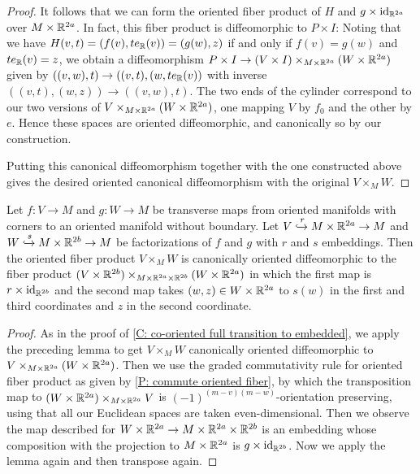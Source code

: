 \begin{proof}
It follows that we can form the oriented fiber product of $H$ and $g\times\mathrm{id}_{\mathbb{R}^{2a}}$ over $M\times \mathbb{R}^{2a}$.  In fact, this fiber product is diffeomorphic to $P\times I$: Noting that we have $H(v,t)=(f(v),te_{\mathbb{R}}(v))=(g(w),z)$ if and only if $f(v)=g(w)$ and $te_{\mathbb{R}}(v)=z$,  we obtain a diffeomorphism $P\times I\to (V\times I)\times_{M\times \mathbb{R}^{2a}}(W\times \mathbb{R}^{2a})$ given by $((v,w),t)\to ((v,t),(w, te_{\mathbb{R}}(v))$ with inverse $((v,t),(w,z))\to ((v,w),t)$. The two ends of the cylinder correspond to our two versions of $V\times_{M\times \mathbb{R}^{2a}} (W\times \mathbb{R}^{2a})$, one mapping $V$ by $f_0$ and the other by $e$. Hence these spaces are oriented diffeomorphic, and canonically so by our construction.  

Putting this canonical diffeomorphism together with the one constructed above gives the desired oriented canonical diffeomorphism with the original $V\times_M W$. 
\end{proof}

\begin{corollary}\label{C: oriented full transition to embedded}
Let $f:V\to M$ and $g:W\to M$ be transverse  maps from oriented manifolds with corners to an oriented manifold without boundary.  Let $V\xhookrightarrow{r} M\times \mathbb{R}^{2a}\to M$ and $W\xhookrightarrow{s} M\times \mathbb{R}^{2b}\to M$ be factorizations of $f$ and $g$ with $r$ and $s$ embeddings.
Then the oriented fiber product $V\times_M W$ is canonically oriented diffeomorphic to the fiber product $(V\times \mathbb{R}^{2b})\times_{M\times \mathbb{R}^{2a}\times \mathbb{R}^{2b}}(W\times \mathbb{R}^{2a})$ in which the first map is $r\times \mathrm{id}_{\mathbb{R}^{2b}}$ and the second map takes $(w,z)\in W\times \mathbb{R}^{2a}$ to $s(w)$ in the first and third coordinates and $z$ in the second coordinate. 
\end{corollary}
\begin{proof}
As in the proof of \cref{C: co-oriented full transition to embedded},
we apply the preceding lemma to get  $V\times_M W$ canonically oriented diffeomorphic to $V\times_{M\times \mathbb{R}^{2a}}(W\times \mathbb{R}^{2a})$. Then we use the graded commutativity rule for oriented fiber product as given by \cref{P: commute oriented fiber},
 by which 
 the transposition  map to $(W\times \mathbb{R}^{2a})\times_{M\times \mathbb{R}^{2a}}V$ is $(-1)^{(m-v)(m-w)}$-orientation preserving, using that all our Euclidean spaces are taken even-dimensional. Then we observe the map described for $W\times \mathbb{R}^{2a}\to M\times \mathbb{R}^{2a}\times \mathbb{R}^{2b}$ is an embedding whose composition with the projection to $M\times \mathbb{R}^{2a}$ is $g\times \mathrm{id}_{\mathbb{R}^{2b}}$. 
 Now we apply the lemma again and then transpose again. 
\end{proof}

